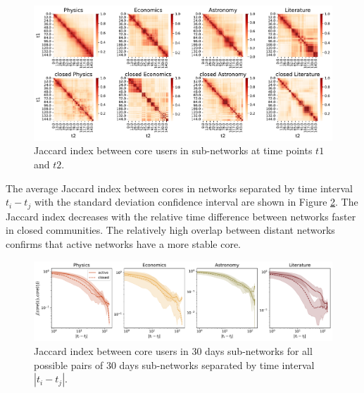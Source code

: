 \begin{figure}[h!]
	\centering
	\includegraphics[width=\linewidth]{figures/stackexchange/jaccard_heatmap.pdf}
	\caption[Mean Jaccard index between core users.]{Jaccard index between core users in  sub-networks at time points $t1$ and $t2$.}
	\label{fig:jaccard_hm}
\end{figure}  

The average Jaccard index between cores in networks separated by time interval $t_i-t_j$ with the standard deviation confidence interval are shown in Figure \ref{fig:jaccard_mean}. The Jaccard index decreases with the relative time difference between networks faster in closed communities. The relatively high overlap between distant networks confirms that active networks have a more stable core. 

\begin{figure}[h!]
	\centering
	\includegraphics[width=\linewidth]{figures/stackexchange/jaccard.pdf}
	\caption[Mean Jaccard index between core users.]{Jaccard index between core users in 30 days sub-networks for all possible pairs of 30 days sub-networks separated by time interval $|t_i - t_j|$.}
	\label{fig:jaccard_mean}
\end{figure}

